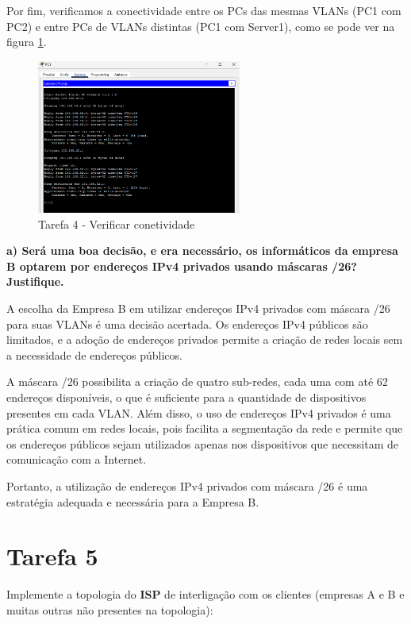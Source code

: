 \documentclass[11pt,english, openright, oneside]{book}
\begin{document}
Por fim, verificamos a conectividade entre os PCs das mesmas VLANs (PC1 com PC2) e entre PCs de VLANs distintas (PC1 com Server1), como se pode ver na figura \ref{fig:4.1.7}.

\begin{figure}[H]
    \centering
    \includegraphics[width=0.6\textwidth]{imagens/Tarefa4/4.1.7.png}
    \caption{Tarefa 4 - Verificar conetividade}
    \label{fig:4.1.7}
\end{figure}

\vspace{0.8cm}

\textbf{a) Será uma boa decisão, e era necessário, os informáticos da empresa B optarem por endereços IPv4 privados usando máscaras /26? Justifique.}
\vspace{0.2cm}

A escolha da Empresa B em utilizar endereços IPv4 privados com máscara /26 para suas VLANs é uma decisão acertada. Os endereços IPv4 públicos são limitados, e a adoção de endereços privados permite a criação de redes locais sem a necessidade de endereços públicos.

A máscara /26 possibilita a criação de quatro sub-redes, cada uma com até 62 endereços disponíveis, o que é suficiente para a quantidade de dispositivos presentes em cada VLAN. Além disso, o uso de endereços IPv4 privados é uma prática comum em redes locais, pois facilita a segmentação da rede e permite que os endereços públicos sejam utilizados apenas nos dispositivos que necessitam de comunicação com a Internet.

Portanto, a utilização de endereços IPv4 privados com máscara /26 é uma estratégia adequada e necessária para a Empresa B.

\pagebreak

\section{Tarefa 5}
Implemente a topologia do \textbf{ISP} de interligação com os clientes (empresas A e B e muitas outras não presentes na topologia):   
\vspace{0.8cm}
\end{document}
